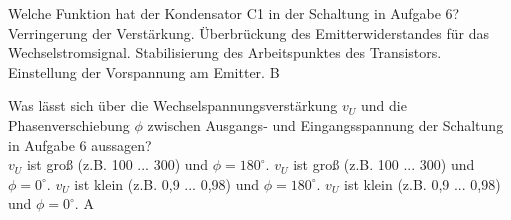 {Welche Funktion hat der Kondensator C1 in der  Schaltung in Aufgabe 6?\\
}%
{Verringerung der Verstärkung.}%
{Überbrückung des Emitterwiderstandes für das Wechselstromsignal.}%
{Stabilisierung des Arbeitspunktes des Transistors.}%
{Einstellung der Vorspannung am Emitter.}%
{B}%

{Was lässt sich über die Wechselspannungsverstärkung $v_U$ und die Phasenverschiebung $\phi$ zwischen Ausgangs- und Eingangsspannung der Schaltung in Aufgabe 6 aussagen?\\
}%
{$v_U$ ist groß (z.B. 100 ... 300) und $\phi=180^\circ$.}%
{$v_U$ ist groß (z.B. 100 ... 300) und $\phi=0^\circ$.}%
{$v_U$ ist klein (z.B. 0,9 ... 0,98) und $\phi=180^\circ$.}%
{$v_U$ ist klein (z.B. 0,9 ... 0,98) und $\phi=0^\circ$.}%
{A}%
